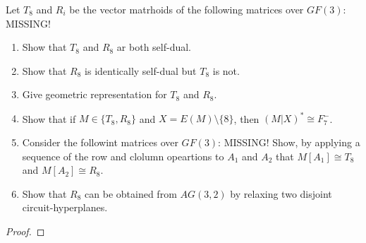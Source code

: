 \prob
{
    Let $T_8$ and $R_i$ be the vector matrhoids of the following matrices over $GF(3)$:\pn
      MISSING!\pn
    
    \begin{enumerate}[label=(\roman*)]
        \item Show that $T_8$ and $R_8$ ar both self-dual.
        \item Show that $R_8$ is identically self-dual but $T_8$ is not.
        \item Give geometric representation for $T_8$ and $R_8$.
        \item Show that if $M \in \{T_8, R_8\}$ and $X = E(M) \setminus \{8\}$, then
                $(M|X)^* \cong F_7^-$.
        \item Consider the followint matrices over $GF(3)$:
        MISSING!\pn
            Show, by applying a sequence of the row and clolumn opeartions to $A_1$ and $A_2$
            that $M[A_1] \cong T_8$ and $M[A_2] \cong R_8$.
        \item Show that $R_8$ can be obtained from $AG(3, 2)$ by relaxing two disjoint 
            circuit-hyperplanes.
    \end{enumerate}
}
\begin{proof}
\end{proof}